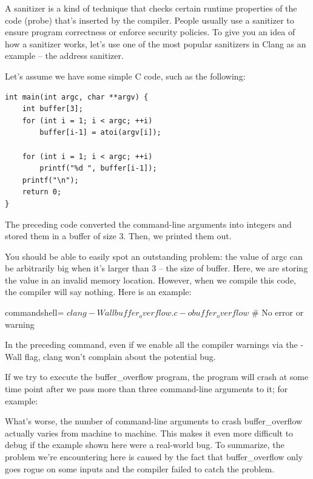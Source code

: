 
A sanitizer is a kind of technique that checks certain runtime properties of the code (probe) that's inserted by the compiler. People usually use a sanitizer to ensure program correctness or enforce security policies. To give you an idea of how a sanitizer works, let's use one of the most popular sanitizers in Clang as an example – the address sanitizer.


Let's assume we have some simple C code, such as the following:

\begin{lstlisting}[style=styleCXX]
int main(int argc, char **argv) {
	int buffer[3];
	for (int i = 1; i < argc; ++i)
		buffer[i-1] = atoi(argv[i]);
		
	for (int i = 1; i < argc; ++i)
		printf("%d ", buffer[i-1]);
	printf("\n");
	return 0;
}
\end{lstlisting}

The preceding code converted the command-line arguments into integers and stored them in a buffer of size 3. Then, we printed them out.

You should be able to easily spot an outstanding problem: the value of argc can be arbitrarily big when it's larger than 3 – the size of buffer. Here, we are storing the value in an invalid memory location. However, when we compile this code, the compiler will say nothing. Here is an example:

\begin{tcblisting}{commandshell={}}
$ clang -Wall buffer_overflow.c -o buffer_overflow
$ # No error or warning
\end{tcblisting}

In the preceding command, even if we enable all the compiler warnings via the -Wall flag, clang won't complain about the potential bug.

If we try to execute the buffer\_overflow program, the program will crash at some time point after we pass more than three command-line arguments to it; for example:


What's worse, the number of command-line arguments to crash buffer\_overflow actually varies from machine to machine. This makes it even more difficult to debug if the example shown here were a real-world bug. To summarize, the problem we're encountering here is caused by the fact that buffer\_overflow only goes rogue on some inputs and the compiler failed to catch the problem. 

